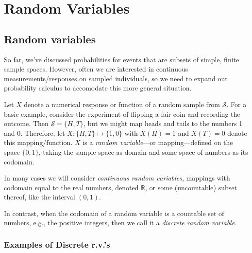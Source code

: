 \documentclass[
]{book}
\begin{document}
\hypertarget{random-variables}{%
\chapter{Random Variables}\label{random-variables}}

\hypertarget{random-variables-1}{%
\section{Random variables}\label{random-variables-1}}

So far, we've discussed probabilities for events that are subsets of simple, finite sample spaces. However, often we are interested in continuous measurements/responses on sampled individuals, so we need to expand our probability calculus to accomodate this more general situation.

Let \(X\) denote a numerical response or function of a random sample from \(\mathcal{S}\). For a basic example, consider the experiment of flipping a fair coin and recording the outcome. Then \(\mathcal{S} = \{H, T\}\), but we might map heads and tails to the numbers 1 and 0. Therefore, let \(X:\{H,T\}\mapsto \{1,0\}\) with \(X(H) = 1\) and \(X(T) = 0\) denote this mapping/function. \(X\) is a \emph{random variable}---or mapping---defined on the space \(\{0,1\}\), taking the sample space as domain and some space of numbers as its codomain.

In many cases we will consider \emph{continuous random variables}, mappings with codomain equal to the real numbers, denoted \(\mathbb{R}\), or some (uncountable) subset thereof, like the interval \((0,1)\).

In contrast, when the codomain of a random variable is a countable set of numbers, e.g., the positive integers, then we call it a \emph{discrete random variable}.

\hypertarget{examples-of-discrete-r.v.s}{%
\subsection{Examples of Discrete r.v.'s}\label{examples-of-discrete-r.v.s}}
\end{document}
